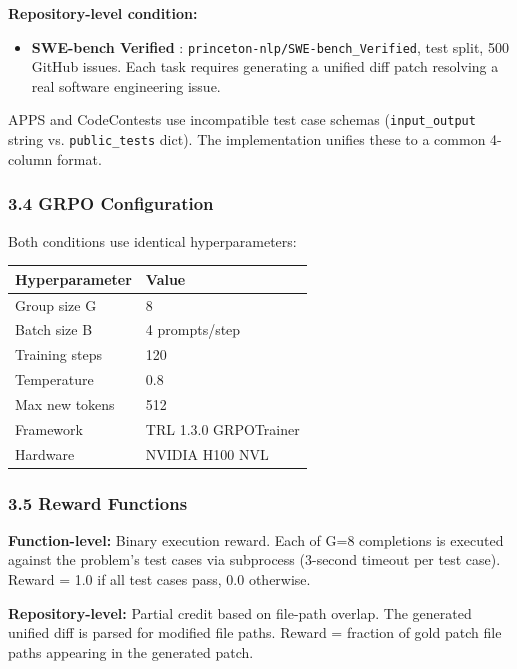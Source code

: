 \textbf{Repository-level condition:}
\begin{itemize}
\item \textbf{SWE-bench Verified} \citep{Jimenezetal2024}: \texttt{princeton-nlp/SWE-bench_Verified}, test split, 500 GitHub issues. Each task requires generating a unified diff patch resolving a real software engineering issue.
\end{itemize}

APPS and CodeContests use incompatible test case schemas (\texttt{input_output} string vs. \texttt{public_tests} dict). The implementation unifies these to a common 4-column format.

\subsubsection{3.4 GRPO Configuration}

Both conditions use identical hyperparameters:

\begin{table}[htbp]
\centering
\begin{tabular}{ll}
\toprule
Hyperparameter & Value \\
\midrule
Group size G & 8 \\
Batch size B & 4 prompts/step \\
Training steps & 120 \\
Temperature & 0.8 \\
Max new tokens & 512 \\
Framework & TRL 1.3.0 GRPOTrainer \\
Hardware & NVIDIA H100 NVL \\
\bottomrule
\end{tabular}
\end{table}

\subsubsection{3.5 Reward Functions}

\textbf{Function-level:} Binary execution reward. Each of G=8 completions is executed against the problem's test cases via subprocess (3-second timeout per test case). Reward = 1.0 if all test cases pass, 0.0 otherwise.

\textbf{Repository-level:} Partial credit based on file-path overlap. The generated unified diff is parsed for modified file paths. Reward = fraction of gold patch file paths appearing in the generated patch.

